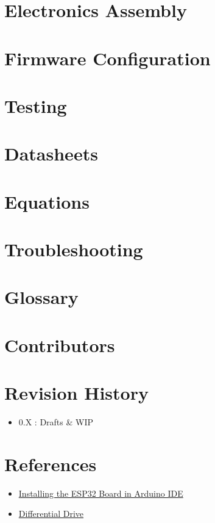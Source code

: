\documentclass[11pt]{report}
\begin{document}
\chapter{Electronics Assembly}
\chapter{Firmware Configuration}
\chapter{Testing}

\appendix

\chapter{Datasheets}
\chapter{Equations}
\chapter{Troubleshooting}
\chapter{Glossary}


\chapter*{Contributors}

\chapter*{Revision History}
\begin{itemize}
	\item 0.X : Drafts \& WIP
\end{itemize}

\chapter*{References}
	\begin{itemize}
		\item \href{https://randomnerdtutorials.com/installing-the-esp32-board-in-arduino-ide-windows-instructions/}
			{Installing the ESP32 Board in Arduino IDE }
		\item \href{https://existentialrobotics.org/RobotProvingGrounds/algorithms/control/content/diffy_drive/}
			{Differential Drive}
	\end{itemize}
\end{document}
